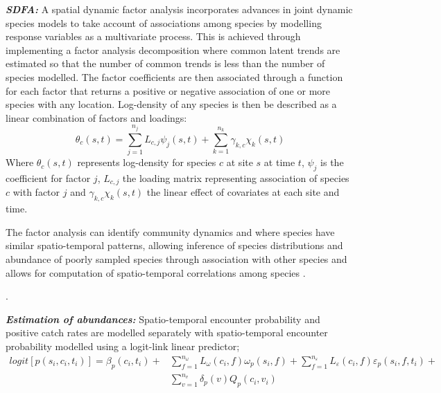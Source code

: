 \documentclass{nature}
\begin{document}
\textbf{\textit{SDFA:}} A spatial dynamic factor analysis incorporates advances
in joint dynamic species models\cite{Thorson2017} to take account of
associations among species by modelling response variables as a
multivariate process. This is achieved through implementing a factor analysis
decomposition where common latent trends are estimated so that the number of
common trends is less than the number of species modelled. The factor
coefficients are then associated through a function for each factor that
returns a positive or negative association of one or more species with any
location. Log-density of any species is then be described as a linear
combination of factors and loadings:
	\begin{equation}
		\theta_{c}(s,t) = \sum_{j=1}^{n_{j}}
		L_{c,j}\psi_{j}(s,t) +\sum_{k=1}^{n_{k}}
		\gamma_{k,c}\chi_{k}(s,t)
	\end{equation}
Where $\theta_{c}(s,t)$ represents log-density for species $c$ at site $s$ at
time $t$, $\psi_{j}$ is the coefficient for factor $j$, $L_{c,j}$ the loading
matrix representing association of species $c$ with factor $j$ and
$\gamma_{k,c}\chi_{k}(s,t)$ the linear effect of covariates at each site and
time\cite{Thorson2016b}. 

The factor analysis can identify community dynamics and where species have
similar spatio-temporal patterns, allowing inference of species distributions
and abundance of poorly sampled species through association with other species
and allows for computation of spatio-temporal correlations among species
\cite{Thorson2016b}.

. 

\textbf{\textit{Estimation of abundances:}} Spatio-temporal encounter
probability and positive catch rates are modelled separately with
spatio-temporal encounter probability modelled using a logit-link linear
predictor;
		\begin{equation}
			\begin{split}
			logit[p(s_{i},c_{i},t_{i})] =	\beta_{p}(c_{i},t_{i}) +
			& \sum\limits_{f=1}^{n_{\omega}} L_{\omega}(c_{i},f)
			\omega_{p}(s_{i},f) + \sum\limits_{f=1}^{n_{\varepsilon}}
			L_{\varepsilon}(c_{i},f) \varepsilon_{p}(s_{i},f,t_{i}) + \\ 
			& \sum\limits_{v=1}^{n_{v}}\delta_{p}(v)Q_{p}(c_{i}, v_{i})
		\end{split}
		\end{equation}
\end{document}
